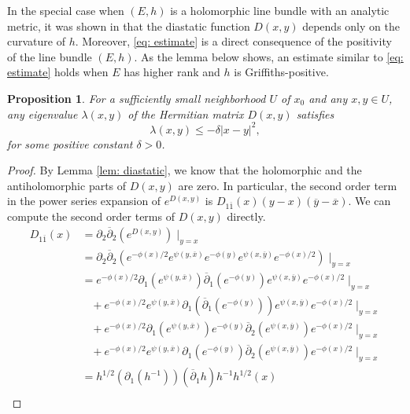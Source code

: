 \documentclass{amsart}
\newtheorem{prop}[thm]{Proposition}
\theoremstyle{definition}
\theoremstyle{remark}
\numberwithin{equation}{section}
\begin{document}
In the special case when $(E,h)$ is a holomorphic line bundle with an analytic metric, it was shown in \cite{C} that the diastatic function $D(x,y)$ depends only on the curvature of $h$. Moreover, \eqref{eq: estimate} is a direct consequence of the positivity of the line bundle $(E,h)$. As the lemma below shows, an estimate similar to \eqref{eq: estimate} holds when $E$ has higher rank and $h$ is Griffiths-positive.


\begin{prop} \label{prop: main estimate 1}
For a sufficiently small neighborhood $U$ of $x_0$ and any $x,y \in U$, any eigenvalue $\lambda(x,y)$ of the Hermitian matrix $D(x,y)$ satisfies
$$
\lambda (x,y) \leq -\delta|x-y|^2,
$$ 
for some positive constant $\delta > 0$.
\end{prop}

\begin{proof}
By Lemma \ref{lem: diastatic}, we know that the holomorphic and the antiholomorphic parts of $D(x,y)$ are zero. In particular, the second order term in the power series expansion of $e^{D(x,y)}$ is $D_{1\overline{1}}(x)(y-x)(\overline{y} - \overline{x})$. We can compute the second order terms of $D(x,y)$ directly.
\begin{align*}
D_{1\overline{1}}(x) 
    & = \partial_2 \overline{\partial}_2 \left ( e^{D(x,y)} \right ) \mid_{y = x} \\
    & = \partial_2 \overline{\partial}_2 \left ( e^{-\phi(x)/2} e^{\psi(y,\overline{x})} e^{-\phi(y)} e^{\psi(x,\overline{y})} e^{-\phi(x)/2} \right ) \mid_{y=x} \\
    & = e^{-\phi(x)/2} \partial_1 (e^{\psi(y,\overline{x})}) \overline{\partial}_1 (e^{-\phi(y)}) e^{\psi(x,\overline{y})} e^{-\phi(x)/2}  \mid_{y=x} \\
    & \hspace{10pt} +  e^{-\phi(x)/2} e^{\psi(y,\overline{x})} \partial_1 ( \overline{\partial}_1 (e^{-\phi(y)}) )e^{\psi(x,\overline{y})} e^{-\phi(x)/2}  \mid_{y=x}\\
    & \hspace{10pt} +  e^{-\phi(x)/2} \partial_1(e^{\psi(y,\overline{x})}) e^{-\phi(y)} \overline{\partial}_2 (e^{\psi(x,\overline{y})}) e^{-\phi(x)/2} \mid_{y=x} \\
    & \hspace{10pt} +  e^{-\phi(x)/2} e^{\psi(y,\overline{x})} \partial_1(e^{-\phi(y)}) \overline{\partial}_2 (e^{\psi(x,\overline{y})}) e^{-\phi(x)/2} \mid_{y=x} \\
    & = h^{1/2} (\partial_1(h^{-1})) (\overline{\partial}_1 h) h^{-1}h^{1/2}(x) \\

\end{align*}
\end{proof}
\end{document}
